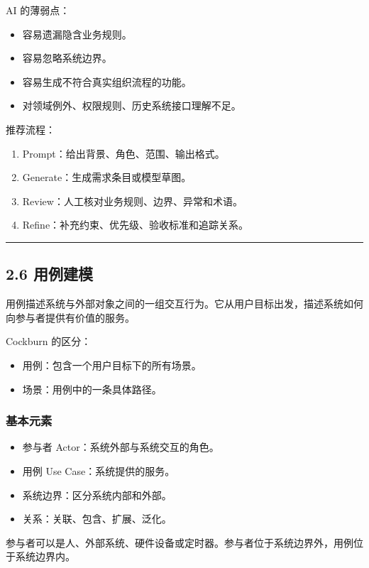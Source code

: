 \documentclass[UTF8,zihao=-4]{ctexart}
\begin{document}
AI 的薄弱点：

\begin{itemize}
\item 容易遗漏隐含业务规则。
\item 容易忽略系统边界。
\item 容易生成不符合真实组织流程的功能。
\item 对领域例外、权限规则、历史系统接口理解不足。
\end{itemize}

推荐流程：

\begin{enumerate}
\item Prompt：给出背景、角色、范围、输出格式。
\item Generate：生成需求条目或模型草图。
\item Review：人工核对业务规则、边界、异常和术语。
\item Refine：补充约束、优先级、验收标准和追踪关系。
\end{enumerate}

\bigskip\hrule\bigskip

\subsection{2.6 用例建模}

用例描述系统与外部对象之间的一组交互行为。它从用户目标出发，描述系统如何向参与者提供有价值的服务。

Cockburn 的区分：

\begin{itemize}
\item 用例：包含一个用户目标下的所有场景。
\item 场景：用例中的一条具体路径。
\end{itemize}

\subsubsection{基本元素}

\begin{itemize}
\item 参与者 Actor：系统外部与系统交互的角色。
\item 用例 Use Case：系统提供的服务。
\item 系统边界：区分系统内部和外部。
\item 关系：关联、包含、扩展、泛化。
\end{itemize}

参与者可以是人、外部系统、硬件设备或定时器。参与者位于系统边界外，用例位于系统边界内。
\end{document}
